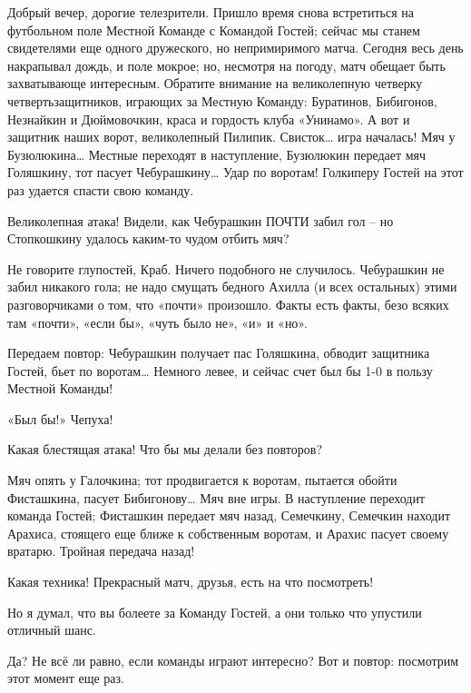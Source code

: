 \documentclass[../main.tex]{subfiles}
\begin{document}
\begin{dialogue}
 Добрый вечер, дорогие телезрители. Пришло время снова встретиться на футбольном поле Местной Команде с Командой Гостей; сейчас мы станем свидетелями еще одного дружеского, но непримиримого матча. Сегодня весь день накрапывал дождь, и поле мокрое; но, несмотря на погоду, матч обещает быть захватывающе интересным. Обратите внимание на великолепную четверку четвертьзащитников, играющих за Местную Команду: Буратинов, Бибигонов, Незнайкин и Дюймовочкин, краса и гордость клуба «Унинамо». А вот и защитник наших ворот, великолепный Пилипик. Свисток\ldots{} игра началась! Мяч у Бузюлюкина\ldots{} Местные переходят в наступление, Бузюлюкин передает мяч Голяшкину, тот пасует Чебурашкину\ldots{} Удар по воротам! Голкиперу Гостей на этот раз удается спасти свою команду.

 Великолепная атака! Видели, как Чебурашкин ПОЧТИ забил гол \--- но Стопкошкину удалось каким-то чудом отбить мяч?

 Не говорите глупостей, Краб. Ничего подобного не случилось. Чебурашкин не забил никакого гола; не надо смущать бедного Ахилла (и всех остальных) этими разговорчиками о том, что «почти» произошло. Факты есть факты, безо всяких там «почти», «если бы», «чуть было не», «и» и «но».

 Передаем повтор: Чебурашкин получает пас Голяшкина, обводит защитника Гостей, бьет по воротам\ldots{} Немного левее, и сейчас счет был бы 1-0 в пользу Местной Команды!

 «Был бы!» Чепуха!

 Какая блестящая атака! Что бы мы делали без повторов?

 Мяч опять у Галочкина; тот продвигается к воротам, пытается обойти Фисташкина, пасует Бибигонову\ldots{} Мяч вне игры. В наступление переходит команда Гостей; Фисташкин передает мяч назад, Семечкину, Семечкин находит Арахиса, стоящего еще ближе к собственным воротам, и Арахис пасует своему вратарю. Тройная передача назад!

 Какая техника! Прекрасный матч, друзья, есть на что посмотреть!

 Но я думал, что вы болеете за Команду Гостей, а они только что упустили отличный шанс.

 Да? Не всё ли равно, если команды играют интересно? Вот и повтор: посмотрим этот момент еще раз.



\end{dialogue}
\end{document}
